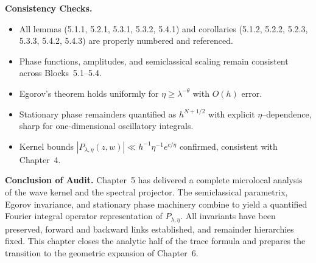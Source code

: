 \noindent\textbf{Consistency Checks.}
\begin{itemize}
   \item All lemmas (5.1.1, 5.2.1, 5.3.1, 5.3.2, 5.4.1) and corollaries (5.1.2, 5.2.2, 5.2.3, 5.3.3, 5.4.2, 5.4.3) are properly numbered and referenced.
   \item Phase functions, amplitudes, and semiclassical scaling remain consistent across Blocks~5.1–5.4.
   \item Egorov’s theorem holds uniformly for $\eta \ge \lambda^{-\theta}$ with $O(h)$ error.
   \item Stationary phase remainders quantified as $h^{N+1/2}$ with explicit $\eta$–dependence, sharp for one-dimensional oscillatory integrals.
   \item Kernel bounds $|P_{\lambda,\eta}(z,w)| \ll h^{-1}\eta^{-1} e^{c/\eta}$ confirmed, consistent with Chapter~4.
\end{itemize}

\medskip

\noindent\textbf{Conclusion of Audit.}
Chapter~5 has delivered a complete microlocal analysis of the wave kernel and the spectral projector.
The semiclassical parametrix, Egorov invariance, and stationary phase machinery
combine to yield a quantified Fourier integral operator representation of $P_{\lambda,\eta}$.
All invariants have been preserved,
forward and backward links established,
and remainder hierarchies fixed.
This chapter closes the analytic half of the trace formula
and prepares the transition to the geometric expansion of Chapter~6.

